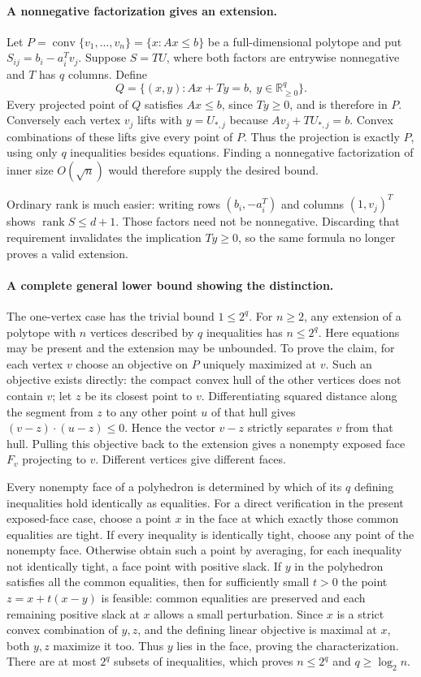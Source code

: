 \documentclass[11pt]{article}
\begin{document}
\paragraph{A nonnegative factorization gives an extension.}
Let $P=\operatorname{conv}\{v_1,\ldots,v_n\}
=\{x:Ax\le b\}$ be a full-dimensional polytope and put
$S_{ij}=b_i-a_i^Tv_j$. Suppose $S=TU$, where both factors
are entrywise nonnegative and $T$ has $q$ columns. Define
\[
Q=\{(x,y):Ax+Ty=b,\ y\in\mathbb R^q_{\ge0}\}.
\]
Every projected point of $Q$ satisfies $Ax\le b$, since
$Ty\ge0$, and is therefore in $P$. Conversely each vertex
$v_j$ lifts with $y=U_{*,j}$ because $Av_j+TU_{*,j}=b$.
Convex combinations of these lifts give every point of $P$.
Thus the projection is exactly $P$, using only $q$ inequalities
besides equations. Finding a nonnegative factorization of inner size
$O(\sqrt n)$ would therefore supply the desired bound.

Ordinary rank is much easier: writing rows $(b_i,-a_i^T)$
and columns $(1,v_j)^T$ shows $\operatorname{rank}S\le d+1$.
Those factors need not be nonnegative. Discarding that requirement
invalidates the implication $Ty\ge0$, so the same formula no
longer proves a valid extension.

\paragraph{A complete general lower bound showing the distinction.}
The one-vertex case has the trivial bound $1\le2^q$. For $n\ge2$,
any extension of a polytope with $n$ vertices described by $q$
inequalities has $n\le2^q$. Here equations may be present and
the extension may be unbounded. To prove the claim, for each
vertex $v$ choose an objective on $P$ uniquely maximized at
$v$. Such an objective exists directly: the compact convex hull
of the other vertices does not contain $v$; let $z$ be its
closest point to $v$. Differentiating squared distance along the
segment from $z$ to any other point $u$ of that hull gives
$(v-z)\cdot(u-z)\le0$. Hence the vector $v-z$ strictly
separates $v$ from that hull. Pulling this objective back to the
extension gives a nonempty exposed face $F_v$ projecting to $v$.
Different vertices give different faces.

Every nonempty face of a polyhedron is determined by which of its
$q$ defining inequalities hold identically as equalities. For a
direct verification in the present exposed-face case, choose a point
$x$ in the face at which exactly those common equalities are tight.
If every inequality is identically tight, choose any point of the
nonempty face. Otherwise obtain such a point by averaging, for each inequality not
identically tight, a face point with positive slack. If $y$ in
the polyhedron satisfies all the common equalities, then for sufficiently
small $t>0$ the point $z=x+t(x-y)$ is feasible: common
equalities are preserved and each remaining positive slack at $x$
allows a small perturbation. Since $x$ is a strict convex
combination of $y,z$, and the defining linear objective is maximal
at $x$, both $y,z$ maximize it too. Thus $y$ lies in the
face, proving the characterization. There are at most $2^q$
subsets of inequalities, which proves $n\le2^q$ and
$q\ge\log_2 n$.
\end{document}
